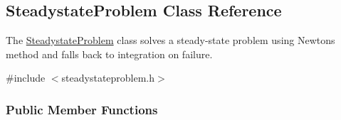 \hypertarget{classamici_1_1_steadystate_problem}{}\subsection{Steadystate\+Problem Class Reference}
\label{classamici_1_1_steadystate_problem}


The \mbox{\hyperlink{classamici_1_1_steadystate_problem}{Steadystate\+Problem}} class solves a steady-\/state problem using Newton\textquotesingle{}s method and falls back to integration on failure.  




{\ttfamily \#include $<$steadystateproblem.\+h$>$}

\subsubsection*{Public Member Functions}
